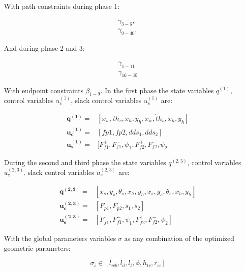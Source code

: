 \documentclass[default,iicol]{sn-jnl}
\theoremstyle{thmstyleone}%
\theoremstyle{thmstyletwo}%
\theoremstyle{thmstylethree}%
\begin{document}
With path constraints during phase 1:

\begin{equation}
    \begin{array}{c}
         \gamma_{3-6},  \\
         \gamma_{9-30},
    \end{array}
\end{equation}

And during phase 2 and 3:

\begin{equation}
    \begin{array}{c}
         \gamma_{1-11}  \\
         \gamma_{16-30}
    \end{array}
\end{equation}

With endpoint constraints $\beta_{1-9}$.
In the first phase the state variables $q^{(1)}$, control variables $u_c^{(1)}$, slack control variables $u_s^{(1)}$ are:

\begin{equation}
\begin{array}{rl}
   \mathbf{q^{(1)}} =& [x_w , th_s, x_h, y_h, \dot x_w, \dot th_s,\dot x_h, \dot y_h]    \\
   \mathbf{u_c^{(1)}} =& [fp1, fp2, dds_1, dds_2]  \\
   \mathbf{u_s^{(1)}}=&  [F_{f1}^+, F_{f1}^-, \psi_1,F_{f2}^+, F_{f2}^-, \psi_2 
\end{array}
\end{equation}

During the second and third phase the state variables $q^{(2,3)}$, control variables $u_c^{(2,3)}$, slack control variables $u_s^{(2,3)}$ are:

\begin{equation}
\begin{array}{rl}
   \mathbf{q^{(2,3)}} =& [x_s, y_s, \theta_s, x_h, y_h, \dot x_s, \dot y_s, \dot \theta_s,\dot x_h, \dot y_h]    \\
   \mathbf{u_c^{(2,3)}} =& [F_{p1}, F_{p2}, \ddot s_1, \ddot s_2]  \\
   \mathbf{u_s^{(2,3)}}=&  [F_{f1}^+, F_{f1}^-, \psi_1,F_{f2}^+, F_{f2}^-, \psi_2] 
\end{array}
\end{equation}

With the global parameters variables $\sigma$ as any combination of the optimized geometric parameters: 

\begin{equation}
    \sigma_i \in [l_{wb}, l_d, l_t, \phi, h_{tr}, r_w]
\end{equation}
\end{document}

